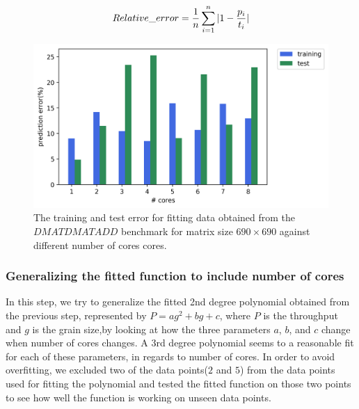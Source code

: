 \begin{equation}{\label{eq2}}
Relative\_{error} = \frac{1}{n}\sum_{i=1}^{n} {|1-\frac{p_i}{t_i}|}
\end{equation}


\vspace{\baselineskip}	
\begin{figure}[H]
	\centering
	\includegraphics[scale=.75]{images/polyfit/fig_train_test_690.png}
	\caption{The training and test error for fitting data obtained from the $DMATDMATADD$ benchmark for matrix size $690\times690$ against different number of cores cores.}	
	\label{fig11}
\end{figure}

\vspace{\baselineskip}	
\subsubsection{Generalizing the fitted function to include number of cores}
In this step, we try to generalize the fitted 2nd degree polynomial obtained from the previous step, represented by $P=ag^2+bg+c$, where $P$ is the throughput and $g$ is the grain size,by looking at how the three parameters $a$, $b$, and $c$ change when number of cores changes. 
A $3$rd degree polynomial seems to a reasonable fit for each of these parameters, in regards to number of cores. In order to avoid overfitting, we excluded two of the data points($2$ and $5$) from the data points used for fitting the polynomial and tested the fitted function on those two points to see how well the function is working on unseen data points. 


